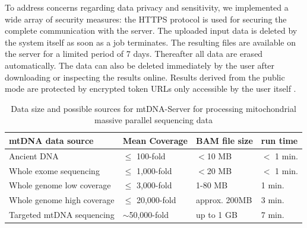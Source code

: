 To address concerns regarding data privacy and sensitivity, we implemented a wide array of security measures: the HTTPS protocol is used for securing the complete communication with the server. The uploaded input data is deleted  by the system itself as soon as a job terminates. The resulting files are available on the server for a limited period of 7 days. Thereafter all data are erased automatically. The data can also be deleted immediately by the user after downloading or inspecting the results online. Results derived from the public mode are protected by encrypted token URLs only accessible by the user itself \cite{Weissensteiner2016b}.
\begin{table}[h]
\centering
\caption{Data size and possible sources for mtDNA-Server for processing mitochondrial massive parallel sequencing data \cite{Weissensteiner2016b}}
\label{mtDNAsource}
\begin{tabular}{llll}
\hline
mtDNA data source &  Mean Coverage & BAM file size & run time\\
\hline
Ancient DNA & $\leq$ 100-fold&  $<$10 MB  & $<$ 1 min.\\
Whole exome sequencing &$\leq$ 1,000-fold&  $<$20 MB  & $<$ 1 min.\\
Whole genome low coverage & $\leq$ 3,000-fold & 1-80 MB  & 1 min.\\
Whole genome high coverage & $\leq$ 20,000-fold & approx. 200MB & 3 min. \\
Targeted mtDNA sequencing &$\sim$50,000-fold & up to 1 GB  & 7 min.
\end{tabular}
\end{table}
